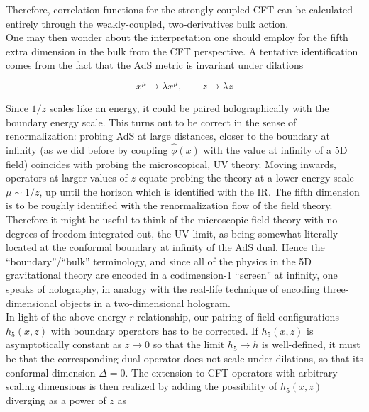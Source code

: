 Therefore, correlation functions for the strongly-coupled CFT can be calculated entirely through the weakly-coupled, two-derivatives bulk action.\\

One may then wonder about the interpretation one should employ for the fifth extra dimension in the bulk from the CFT perspective. A tentative identification comes from the fact that the AdS metric is invariant under dilations

\begin{equation}
	x^\mu \rightarrow \lambda x^\mu, \quad \quad z \rightarrow \lambda z
	\label{}
\end{equation}

Since $1/z$ scales like an energy, it could be paired holographically with the boundary energy scale. This turns out to be correct in the sense of renormalization: probing AdS at large distances, closer to the boundary at infinity (as we did before by coupling $\hat\phi(x)$ with the value at infinity of a 5D field) coincides with probing the microscopical, UV theory. Moving inwards, operators at larger values of $z$ equate probing the theory at a lower energy scale $\mu \sim 1/z$, up until the horizon which is identified with the IR. The fifth dimension is to be roughly identified with the renormalization flow of the field theory.\\

Therefore it might be useful to think of the microscopic field theory with no degrees of freedom integrated out, the UV limit, as being somewhat literally located at the conformal boundary at infinity of the AdS dual. Hence the ``boundary''/``bulk'' terminology, and since all of the physics in the 5D gravitational theory are encoded in a codimension-1 ``screen'' at infinity, one speaks of holography, in analogy with the real-life technique of encoding three-dimensional objects in a two-dimensional hologram.\\

In light of the above energy-$r$ relationship, our pairing of field configurations $h_5(x,z)$ with boundary operators has to be corrected. If $h_5(x,z)$ is asymptotically constant as $z\rightarrow 0$ so that the limit $h_5 \rightarrow h$ is well-defined, it must be that the corresponding dual operator does not scale under dilations, so that its conformal dimension $\Delta = 0$. The extension to CFT operators with arbitrary scaling dimensions is then realized by adding the possibility of $h_5(x,z)$ diverging as a power of $z$ as

